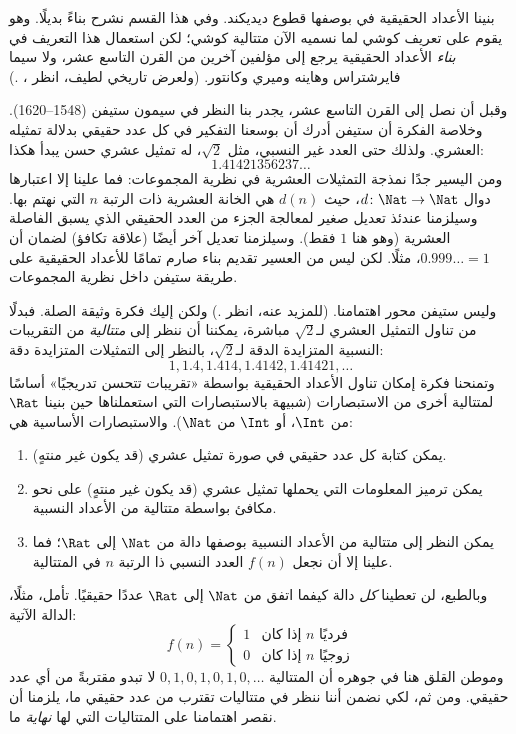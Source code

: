 \documentclass[../../../include/open-logic-section]{subfiles}
\begin{document}


بنينا الأعداد الحقيقية في  بوصفها قطوع ديديكند. وفي
هذا القسم نشرح بناءً بديلًا. وهو يقوم على تعريف كوشي لما نسميه الآن
متتالية كوشي؛ لكن استعمال هذا التعريف في \emph{بناء} الأعداد الحقيقية
يرجع إلى مؤلفين آخرين من القرن التاسع عشر، ولا سيما فايرشتراس وهاينه
وميري وكانتور. (ولعرض تاريخي لطيف، انظر
\citeauthor{OConnorRobertson:RN}،
\citeyear{OConnorRobertson:RN}.)

وقبل أن نصل إلى القرن التاسع عشر، يجدر بنا النظر في سيمون ستيفن
(1548--1620). وخلاصة الفكرة أن ستيفن أدرك أن بوسعنا التفكير في كل عدد
حقيقي بدلالة تمثيله العشري. ولذلك حتى العدد غير النسبي، مثل $\sqrt{2}$،
له تمثيل عشري حسن يبدأ هكذا:
\[
	1.41421356237\ldots
\] 
ومن اليسير جدًا نمذجة التمثيلات العشرية في نظرية المجموعات: فما علينا
إلا اعتبارها دوال $d \colon \Nat \to \Nat$، حيث $d(n)$ هي الخانة
العشرية ذات الرتبة $n$ التي نهتم بها. وسيلزمنا عندئذ تعديل صغير لمعالجة
الجزء من العدد الحقيقي الذي يسبق الفاصلة العشرية (وهو هنا $1$ فقط).
وسيلزمنا تعديل آخر أيضًا (علاقة تكافؤ) لضمان أن $0.999\ldots = 1$،
مثلًا. لكن ليس من العسير تقديم بناء صارم تمامًا للأعداد الحقيقية على
طريقة ستيفن داخل نظرية المجموعات.

وليس ستيفن محور اهتمامنا. (للمزيد عنه، انظر
\citealt{KatzKatz2012}.) ولكن إليك فكرة وثيقة الصلة. فبدلًا من تناول
التمثيل العشري لـ$\sqrt{2}$ مباشرة، يمكننا أن ننظر إلى \emph{متتالية}
من التقريبات النسبية المتزايدة الدقة لـ$\sqrt{2}$، بالنظر إلى
التمثيلات المتزايدة دقة:
\[
1, 1.4, 1.414, 1.4142, 1.41421,\ldots
\]
وتمنحنا فكرة إمكان تناول الأعداد الحقيقية بواسطة «تقريبات تتحسن
تدريجيًا» أساسًا لمتتالية أخرى من الاستبصارات (شبيهة بالاستبصارات التي
استعملناها حين بنينا $\Rat$ من $\Int$، أو $\Int$ من $\Nat$).
والاستبصارات الأساسية هي:
\begin{enumerate}
	\item يمكن كتابة كل عدد حقيقي في صورة تمثيل عشري (قد يكون غير
	منتهٍ).
	\item يمكن ترميز المعلومات التي يحملها تمثيل عشري (قد يكون غير
	منتهٍ) على نحو مكافئ بواسطة متتالية من الأعداد النسبية.
	\item يمكن النظر إلى متتالية من الأعداد النسبية بوصفها دالة من
	$\Nat$ إلى $\Rat$؛ فما علينا إلا أن نجعل $f(n)$ العدد النسبي ذا
	الرتبة $n$ في المتتالية.
\end{enumerate}
وبالطبع، لن تعطينا \emph{كل} دالة كيفما اتفق من $\Nat$ إلى $\Rat$
عددًا حقيقيًا. تأمل، مثلًا، الدالة الآتية:
\[
	f(n) =\begin{cases}
			1 & \text{إذا كان }n\text{ فرديًا}\\
			0 &\text{إذا كان }n\text{ زوجيًا}
		\end{cases}
\]
وموطن القلق هنا في جوهره أن المتتالية $0,1,0,1,0,1,0,\ldots$ لا تبدو
مقتربةً من أي عدد حقيقي. ومن ثم، لكي نضمن أننا ننظر في متتاليات تقترب
من عدد حقيقي ما، يلزمنا أن نقصر اهتمامنا على المتتاليات التي لها
\emph{نهاية} ما.
\end{document}
